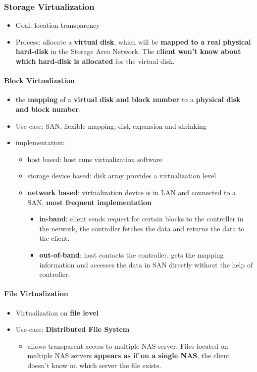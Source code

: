 \subsubsection{Storage Virtualization}
\begin{itemize}
	\item Goal: location transparency
	\item Process: allocate a \textbf{virtual disk}, which will be \textbf{mapped to a real physical hard-disk} in the Storage Area Network. The \textbf{client won't know about which hard-disk is allocated} for the virtual disk.
\end{itemize}
\paragraph{Block Virtualization}
\begin{itemize}
	\item the \textbf{mapping} of a \textbf{virtual disk and block number} to a \textbf{physical disk and block number}.
	\item Use-case: SAN, flexible mapping, disk expansion and shrinking
	\item implementation:
	\begin{itemize}
		\item host based: host runs virtualization software
		\item storage device based: disk array provides a virtualization level
		\item \textbf{network based}: virtualization device is in LAN and connected to a SAN, \textbf{most frequent implementation}
		\begin{itemize}
			\item \textbf{in-band}: client sends request for certain blocks to the controller in the network, the controller fetches the data and returns the data to the client.
			\item \textbf{out-of-band}: host contacts the controller, gets the mapping information and accesses the data in SAN directly without the help of controller.
		\end{itemize}
	\end{itemize}
\end{itemize}

\paragraph{File Virtualization}
\begin{itemize}
	\item Virtualization on \textbf{file level}
	\item Use-case: \textbf{Distributed File System}
	\begin{itemize}
		\item allows transparent access to multiple NAS server. Files located on multiple NAS servers \textbf{appears as if on a single NAS}, the client doesn't know on which server the file exists.
	\end{itemize} 
\end{itemize}
